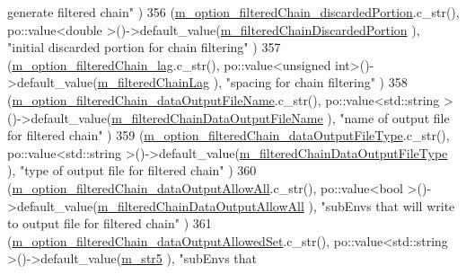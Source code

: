 \begin{DoxyCode}
{      generate filtered chain"}                                         )
356     (\hyperlink{class_q_u_e_s_o_1_1_m_l_sampling_level_options_aa1d2bc1ba487c867b5ab68748f1e6c55}{m\_option\_filteredChain\_discardedPortion}.c\_str(),             
      po::value<double      >()->default\_value(\hyperlink{class_q_u_e_s_o_1_1_m_l_sampling_level_options_a22220cb7fbdef58a009733f8cf1887f9}{m\_filteredChainDiscardedPortion}       
           ), \textcolor{stringliteral}{"initial discarded portion for chain filtering"}                   )
357     (\hyperlink{class_q_u_e_s_o_1_1_m_l_sampling_level_options_a52e58ef7b6d840b8c6f7d505ba9cf1b2}{m\_option\_filteredChain\_lag}.c\_str(),                          
      po::value<unsigned int>()->default\_value(\hyperlink{class_q_u_e_s_o_1_1_m_l_sampling_level_options_a6740efa52d4f8ec112be817f5220cf94}{m\_filteredChainLag}                         ), \textcolor{stringliteral}{"spacing for chain
       filtering"}                                     )
358     (\hyperlink{class_q_u_e_s_o_1_1_m_l_sampling_level_options_af9ec9aa644d0ee22a42a2aa7fdf49218}{m\_option\_filteredChain\_dataOutputFileName}.c\_str(),           
      po::value<std::string >()->default\_value(\hyperlink{class_q_u_e_s_o_1_1_m_l_sampling_level_options_abf333c405ee097104ee9b1b1e92ecd97}{m\_filteredChainDataOutputFileName} 
               ), \textcolor{stringliteral}{"name of output file for filtered chain"}                          )
359     (\hyperlink{class_q_u_e_s_o_1_1_m_l_sampling_level_options_a39e79ec1b87802ecd32bf4999908ecbf}{m\_option\_filteredChain\_dataOutputFileType}.c\_str(),           
      po::value<std::string >()->default\_value(\hyperlink{class_q_u_e_s_o_1_1_m_l_sampling_level_options_a154ba7fd5c2fbc98af0ac91bb022a232}{m\_filteredChainDataOutputFileType} 
               ), \textcolor{stringliteral}{"type of output file for filtered chain"}                          )
360     (\hyperlink{class_q_u_e_s_o_1_1_m_l_sampling_level_options_a87338f130d6059b62643ad609f26bfb6}{m\_option\_filteredChain\_dataOutputAllowAll}.c\_str(),           
      po::value<bool        >()->default\_value(\hyperlink{class_q_u_e_s_o_1_1_m_l_sampling_level_options_a80471ba2c70d39f2cb7e1ea954fb86b8}{m\_filteredChainDataOutputAllowAll} 
               ), \textcolor{stringliteral}{"subEnvs that will write to output file for filtered chain"}       )
361     (\hyperlink{class_q_u_e_s_o_1_1_m_l_sampling_level_options_a830bffae5d6cc92fd551db4ef6dfee64}{m\_option\_filteredChain\_dataOutputAllowedSet}.c\_str(),       
        po::value<std::string >()->default\_value(\hyperlink{class_q_u_e_s_o_1_1_m_l_sampling_level_options_a341ed1186366d5483559298a8c5348d2}{m\_str5}                                     ), \textcolor{stringliteral}{"subEnvs that
}
\end{DoxyCode}
